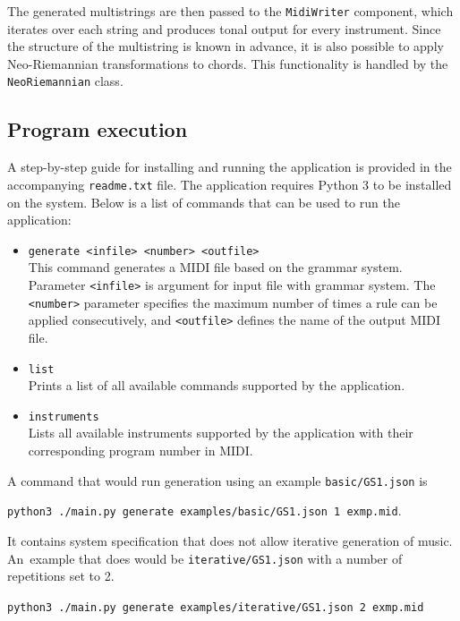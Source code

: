 The generated multistrings are then passed to the \texttt{MidiWriter} component, which iterates over each string and produces tonal output for every instrument. Since the structure of the multistring is known in advance, it is also possible to apply Neo-Riemannian transformations to chords. This functionality is handled by the \texttt{NeoRiemannian} class.

\subsection*{Program execution}
A step-by-step guide for installing and running the application is provided in the accompanying \texttt{readme.txt} file. The application requires Python 3 to be installed on the system. Below is a list of commands that can be used to run the application:

\begin{itemize}
    \item \texttt{generate <infile> <number> <outfile>} \\
    This command generates a MIDI file based on the grammar system. Parameter \texttt{<infile>} is argument for input file with grammar system. The \texttt{<number>} parameter specifies the maximum number of times a rule can be applied consecutively, and \texttt{<outfile>} defines the name of the output MIDI file.

    \item \texttt{list} \\
    Prints a list of all available commands supported by the application.

    \item \texttt{instruments} \\
    Lists all available instruments supported by the application with their corresponding program number in MIDI.
\end{itemize}

A command that would run generation using an example \texttt{basic/GS1.json} is

\texttt{python3 ./main.py generate examples/basic/GS1.json 1 exmp.mid}.

It contains system specification that does not allow iterative generation of music. An~example that does would be \texttt{iterative/GS1.json} with a number of repetitions set to 2.

\texttt{python3 ./main.py generate examples/iterative/GS1.json 2 exmp.mid}

